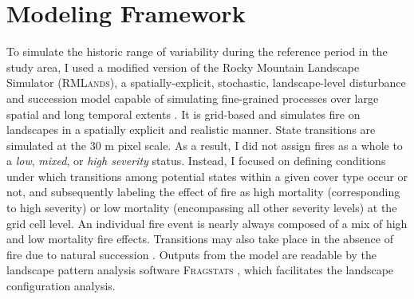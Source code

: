 \section{Modeling Framework}
\label{sec:modelframework}

To simulate the historic range of variability during the reference period in the study area, I used a modified version of the Rocky Mountain Landscape Simulator (\textsc{RMLands}), a spatially-explicit, stochastic, landscape-level disturbance and succession model capable of simulating fine-grained processes over large spatial and long temporal extents \citep{McGarigal2001}. It is grid-based and simulates fire on landscapes in a spatially explicit and realistic manner. State transitions are simulated at the 30 m pixel scale. As a result, I did not assign fires as a whole to a \emph{low}, \emph{mixed}, or \emph{high severity} status. Instead, I focused on defining conditions under which transitions among potential states within a given cover type occur or not, and subsequently labeling the effect of fire as high mortality (corresponding to high severity) or low mortality (encompassing all other severity levels) at the grid cell level. An individual fire event is nearly always composed of a mix of high and low mortality fire effects. Transitions may also take place in the absence of fire due to natural succession \citep{McGarigal2012}. Outputs from the model are readable by the landscape pattern analysis software \textsc{Fragstats} \citep{Fragstats2012}, which facilitates the landscape configuration analysis.

